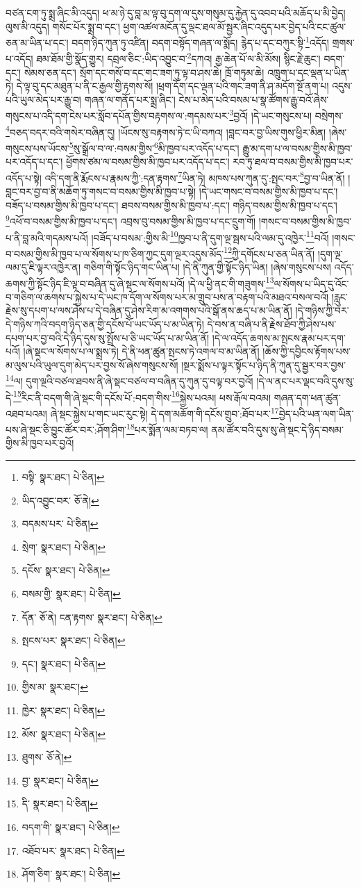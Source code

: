 བཙན་ངག་ཏུ་སྨྲ་ཞིང་མི་འདུད། ཕ་མ་ཉེ་དུ་བླ་མ་ལྟ་བུ་དག་ལ་དུས་གསུམ་དུ་རྐྱེན་དུ་འབབ་པའི་མཆོད་པ་མི་བྱེད། ལུས་མི་འདུད། གསོང་པོར་སྨྲ་བ་དང་། ཕྱག་འཚལ་མངོན་དུ་ལྡང་ཐལ་མོ་སྦྱར་ཞིང་འདུད་པར་བྱེད་པའི་ངང་ཚུལ་ཅན་མ་ཡིན་པ་དང་། བདག་ཉིད་ཀུན་ཏུ་འཛིན། བདག་བསྟོད་གཞན་ལ་སྨོད། རྙེད་པ་དང་བཀུར་སྟི་\footnote{བསྟི་  སྣར་ཐང་།  པེ་ཅིན། }འདོད། གྲགས་པ་འདོད། ཐམ་ཐོམ་གྱི་སྣོད་གྱུར། དབྲལ་ཅིང་:ཡིད་འབྱུང་བ་\footnote{ཡིད་འབྱུང་བར་  ཅོ་ནེ། }དཀའ། རྒྱ་ཆེན་པོ་ལ་མི་མོས། སྙིང་རྗེ་ཆུང་། བདག་དང་། སེམས་ཅན་དང་། སྲོག་དང་གསོ་བ་དང་གང་ཟག་ཏུ་ལྟ་བ་ཤས་ཆེ། ཁྲོ་གཏུམ་ཆེ། འཁྲུག་པ་དང་ལྡན་པ་ཡིན་ཏེ། དེ་ལྟ་བུ་དང་མཐུན་པ་ནི་ང་རྒྱལ་གྱི་རྟགས་སོ། །ཕྲག་དོག་དང་ལྡན་པའི་གང་ཟག་ནི་ཤ་མདོག་སྔོ་ནག་པ། འདུས་པའི་ཡུལ་མེད་པར་རྒྱུ་བ། གཞན་ལ་གནོད་པར་སྨྲ་ཞིང་། ངེས་པ་མེད་པའི་བསམ་པ་སྣ་ཚོགས་རྒྱུ་བའོ་ཞེས་གསུངས་པ་འདི་དག་ངེས་པར་སློབ་དཔོན་གྱིས་བརྟགས་ལ་:གདམས་པར་\footnote{བདམས་པར་  པེ་ཅིན། }བྱའོ། །དེ་ཡང་གསུངས་པ། བསྲེགས་\footnote{སྲེག་  སྣར་ཐང་།  པེ་ཅིན། }བཅད་བདར་བའི་གསེར་བཞིན་དུ། །ཡོངས་སུ་བརྟགས་ཏེ་ང་ཡི་བཀའ། །བླང་བར་བྱ་ཡིས་གུས་ཕྱིར་མིན། །ཞེས་གསུངས་པས་ཡོངས་\footnote{དངོས་  སྣར་ཐང་།  པེ་ཅིན། }སུ་སྒྲོལ་བ་ལ་:བསམ་གྱིས་\footnote{བསམ་གྱི་  སྣར་ཐང་།  པེ་ཅིན། }མི་ཁྱབ་པར་འདོད་པ་དང་། རྒྱུ་མ་དག་པ་ལ་བསམ་གྱིས་མི་ཁྱབ་པར་འདོད་པ་དང་། ཕྱོགས་ཙམ་ལ་བསམ་གྱིས་མི་ཁྱབ་པར་འདོད་པ་དང་། རབ་ཏུ་ཐལ་བ་བསམ་གྱིས་མི་ཁྱབ་པར་འདོད་པ་སྟེ། འདི་དག་ནི་རྨོངས་པ་རྣམས་ཀྱི་:དན་རྟགས་\footnote{དོན་  ཅོ་ནེ། ངན་རྟགས་  སྣར་ཐང་།  པེ་ཅིན། }ཡིན་ཏེ། མཁས་པས་ཀུན་དུ་:སྤང་བར་\footnote{སྤངས་པར་  སྣར་ཐང་།  པེ་ཅིན། }བྱ་བ་ཡིན་ནོ། །བླང་བར་བྱ་བ་ནི་མཆོག་ཏུ་གསང་བ་བསམ་གྱིས་མི་ཁྱབ་པ་སྟེ། །དེ་ཡང་གསང་བ་བསམ་གྱིས་མི་ཁྱབ་པ་དང་། བཟོད་པ་བསམ་གྱིས་མི་ཁྱབ་པ་དང་། ཐབས་བསམ་གྱིས་མི་ཁྱབ་པ་:དང་། གཉིད་བསམ་གྱིས་མི་ཁྱབ་པ་དང་། \footnote{དང་།    སྣར་ཐང་།  པེ་ཅིན། }འཕོ་བ་བསམ་གྱིས་མི་ཁྱབ་པ་དང་། འབྲས་བུ་བསམ་གྱིས་མི་ཁྱབ་པ་དང་དྲུག་གོ། །གསང་བ་བསམ་གྱིས་མི་ཁྱབ་པ་ནི་བླ་མའི་གདམས་པའོ། །བཟོད་པ་བསམ་:གྱིས་མི་\footnote{གྱིས་མ་  སྣར་ཐང་། }ཁྱབ་པ་ནི་དུག་ལྔ་སྦས་པའི་ལམ་དུ་འཁྱེར་\footnote{ཁྱེར་  སྣར་ཐང་།  པེ་ཅིན། }བའོ། །གསང་བ་བསམ་གྱིས་མི་ཁྱབ་པ་ལ་སོགས་པ་ཁ་ཅིག་ཀྱང་དུག་ལྔར་འདུས་མོད་\footnote{མོས་  སྣར་ཐང་།  པེ་ཅིན། }ཀྱི་དགོངས་པ་ཅན་ཡིན་ནོ། །དུག་ལྔ་ལམ་དུ་ཇི་ལྟར་འཁྱེར་ན། གཅིག་གི་སྟོང་ཉིད་གང་ཡིན་པ། །དེ་ནི་ཀུན་གྱི་སྟོང་ཉིད་ཡིན། །ཞེས་གསུངས་པས། འདོད་ཆགས་ཀྱི་སྟོང་ཉིད་ཇི་ལྟ་བ་བཞིན་དུ་ཞེ་སྡང་ལ་སོགས་པའོ། །དེ་ལ་ཕྱི་ནང་གི་གཟུགས་\footnote{ཐུགས་  ཅོ་ནེ། }ལ་སོགས་པ་ཡིད་དུ་འོང་བ་གཅིག་ལ་ཆགས་པ་སྐྱེས་པ་དེ་ཡང་ཁ་དོག་ལ་སོགས་པར་མ་གྲུབ་པས་ན་བརྟག་པའི་མཐའ་བསལ་བའོ། །རླུང་རྗེས་སུ་དཔག་པ་ལས་ཤེས་པ་དེ་བཞིན་དུ་ཤེས་རིག་མ་འགགས་པའི་སྒོ་ནས་ཆད་པ་མ་ཡིན་ནོ། །དེ་གཉིས་ཀྱི་བར་དེ་གཉིས་ཀའི་བདག་ཉིད་ཅན་གྱི་དངོས་པོ་ཡང་ཡོད་པ་མ་ཡིན་ཏེ། དེ་བས་ན་བཞི་པ་ནི་རྗེས་ཐོབ་ཀྱི་ཤེས་པས་དཔག་པར་བྱ་བའི་དེ་ཉིད་དུས་སུ་སྤྲོས་པ་ཅི་ཡང་ཡོད་པ་མ་ཡིན་ནོ། །དེ་ལ་འདོད་ཆགས་མ་སྤངས་རྣམ་པར་དག་པའོ། །ཞེ་སྡང་ལ་སོགས་པ་ལ་སྨྲས་ཏེ། དེ་ནི་ཕན་ཚུན་སྤངས་ཏེ་འགལ་བ་མ་ཡིན་ནོ། །ཆོས་ཀྱི་དབྱིངས་རྟོགས་པས་མ་ལུས་པའི་ཡུལ་དུག་མེད་པར་བྱས་སོ་ཞེས་གསུངས་སོ། །སྔར་སྨོས་པ་ལྟར་སྟོང་པ་ཉིད་ནི་ཀུན་དུ་སྦྱར་བར་བྱས་\footnote{བྱ་  སྣར་ཐང་།  པེ་ཅིན། }ལ། དུག་ལྔའི་བཙལ་ཐབས་ནི་ཞེ་སྡང་བཙལ་བ་བཞིན་དུ་ཀུན་དུ་བལྟ་བར་བྱའོ། །དེ་ལ་ནང་པར་ལྡང་བའི་དུས་སུ་དེ་\footnote{དི་  སྣར་ཐང་།  པེ་ཅིན། }རིང་ནི་བདག་གི་ཞེ་སྡང་གི་དངོས་པོ་:བདག་གིས་\footnote{བདག་གི་  སྣར་ཐང་།  པེ་ཅིན། }སྐྱེས་པའམ། ཕས་རྒོལ་བའམ། གཞན་དག་ཕན་ཚུན་འཐབ་པའམ། ཞེ་སྡང་སྐྱེས་པ་གང་ཡང་རུང་སྟེ། དེ་དག་མཆོག་གི་དངོས་གྲུབ་:ཐོབ་པར་\footnote{འཐོབ་པར་  སྣར་ཐང་།  པེ་ཅིན། }བྱེད་པའི་ཡན་ལག་ཡིན་པས་ཞེ་སྡང་ཅི་བྱུང་ཚོར་བར་:ཤོག་ཤིག་\footnote{ཤོག་ཅིག་  སྣར་ཐང་།  པེ་ཅིན། }པར་སྨོན་ལམ་བཏབ་ལ། ནམ་ཚོར་བའི་དུས་སུ་ཞེ་སྡང་དེ་ཉིད་བསམ་གྱིས་མི་ཁྱབ་པར་བྱའོ། 